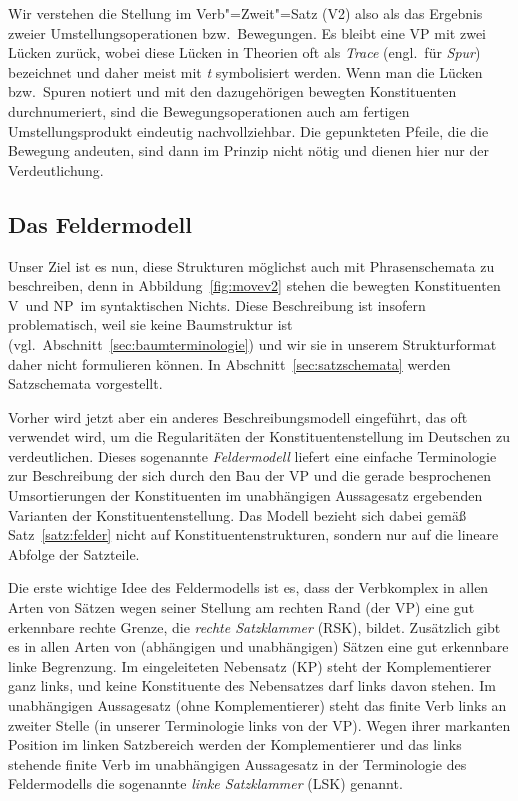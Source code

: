 
Wir verstehen die Stellung im Verb"=Zweit"=Satz (V2) also als das Ergebnis zweier Umstellungsoperationen bzw.\ Bewegungen.
Es bleibt eine VP mit zwei Lücken zurück, wobei diese Lücken in Theorien oft als \textit{Trace} (engl.\ für \textit{Spur}) bezeichnet und daher meist mit \textit{t} symbolisiert werden.
Wenn man die Lücken bzw.\ Spuren notiert und mit den dazugehörigen bewegten Konstituenten durchnumeriert, sind die Bewegungsoperationen auch am fertigen Umstellungsprodukt eindeutig nachvollziehbar.
Die gepunkteten Pfeile, die die Bewegung andeuten, sind dann im Prinzip nicht nötig und dienen hier nur der Verdeutlichung.

\subsection{Das Feldermodell}

\label{sec:feldermodell}

Unser Ziel ist es nun, diese Strukturen möglichst auch mit Phrasenschemata zu beschreiben, denn in Abbildung~\ref{fig:movev2} stehen die bewegten Konstituenten V\ORi\ und NP\ORii\ im syntaktischen Nichts.
Diese Beschreibung ist insofern problematisch, weil sie keine Baumstruktur ist (vgl.\ Abschnitt~\ref{sec:baumterminologie}) und wir sie in unserem Strukturformat daher nicht formulieren können.
In Abschnitt~\ref{sec:satzschemata} werden Satzschemata vorgestellt.

Vorher wird jetzt aber ein anderes Beschreibungsmodell eingeführt, das oft verwendet wird, um die Regularitäten der Konstituentenstellung im Deutschen zu verdeutlichen.
Dieses sogenannte \textit{Feldermodell} liefert eine einfache Terminologie zur Beschreibung der sich durch den Bau der VP und die gerade besprochenen Umsortierungen der Konstituenten im unabhängigen Aussagesatz ergebenden Varianten der Konstituentenstellung.
Das Modell bezieht sich dabei gemäß Satz~\ref{satz:felder} nicht auf Konstituentenstrukturen, sondern nur auf die lineare Abfolge der Satzteile.



Die erste wichtige Idee des Feldermodells ist es, dass der Verbkomplex in allen Arten von Sätzen wegen seiner Stellung am rechten Rand (der VP) eine gut erkennbare rechte Grenze, die \textit{rechte Satzklammer} (RSK), bildet.
Zusätzlich gibt es in allen Arten von (abhängigen und unabhängigen) Sätzen eine gut erkennbare linke Begrenzung.
Im eingeleiteten Nebensatz (KP) steht der Komplementierer ganz links, und keine Konstituente des Nebensatzes darf links davon stehen.
Im unabhängigen Aussagesatz (ohne Komplementierer) steht das finite Verb links an zweiter Stelle (in unserer Terminologie links von der VP).
Wegen ihrer markanten Position im linken Satzbereich werden der Komplementierer und das links stehende finite Verb im unabhängigen Aussagesatz in der Terminologie des Feldermodells die sogenannte \textit{linke Satzklammer} (LSK) genannt.

